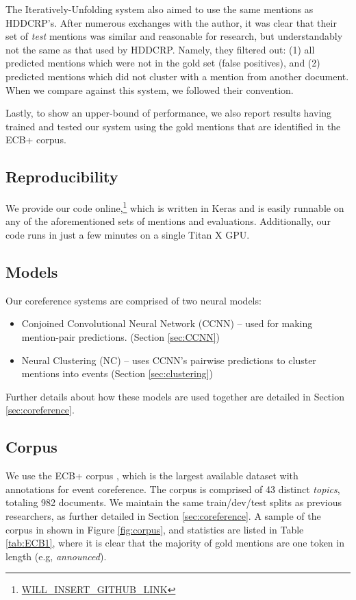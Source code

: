 \documentclass[11pt,a4paper]{article}
\begin{document}
The Iteratively-Unfolding system also aimed to use the same mentions as HDDCRP's.  After numerous exchanges with the author, it was clear that their set of \textit{test} mentions was similar and reasonable for research, but understandably not the same as that used by HDDCRP.  Namely, they filtered out: (1) all predicted mentions which were not in the gold set (false positives), and (2) predicted mentions which did not cluster with a mention from another document.  When we compare against this system, we followed their convention.

Lastly, to show an upper-bound of performance, we also report results having trained and tested our system using the gold mentions that are identified in the ECB+ corpus.

\subsection{Reproducibility}
We provide our code online,\footnote{\url{WILL_INSERT_GITHUB_LINK}} which is written in Keras \cite{chollet2015} and is easily runnable on any of the aforementioned sets of mentions and evaluations.  Additionally, our code runs in just a few minutes on a single Titan X GPU.

\subsection{Models}
Our coreference systems are comprised of two neural models:
\begin{itemize}
  \item Conjoined Convolutional Neural Network (CCNN) -- used for making mention-pair predictions.  (Section \ref{sec:CCNN})
  \item Neural Clustering (NC) -- uses CCNN's pairwise predictions to cluster mentions into events (Section \ref{sec:clustering})
\end{itemize}

Further details about how these models are used together are detailed in Section \ref{sec:coreference}.

\subsection{Corpus}
\label{sec:corpus}
We use the ECB+ corpus \cite{ECB+}, which is the largest available dataset with annotations for event coreference.  The corpus is comprised of 43 distinct \textit{topics}, totaling 982 documents.  We maintain the same train/dev/test splits as previous researchers, as further detailed in Section \ref{sec:coreference}.  A sample of the corpus in shown in Figure \ref{fig:corpus}, and statistics are listed in Table \ref{tab:ECB1}, where it is clear that the majority of gold mentions are one token in length (e.g, \textit{announced}).
\end{document}
